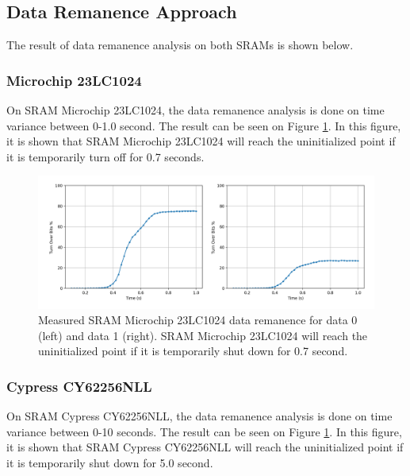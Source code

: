 \subsection{Data Remanence Approach}

The result of data remanence analysis on both SRAMs is shown below.

\subsubsection{Microchip 23LC1024}

On SRAM Microchip 23LC1024, the data remanence analysis is done on time variance between 0-1.0 second. The result can be seen on Figure \ref{fig:23lc1024-remanence0}. In this figure, it is shown that
SRAM Microchip 23LC1024 will reach the uninitialized point if it is temporarily turn off for 0.7 seconds.

\begin{figure}[tph!]
    \centerline{\includegraphics[width={\textwidth}]{images/remanence_23lc1024}}
    \caption{Measured SRAM Microchip 23LC1024 data remanence for data 0 (left) and data 1 (right).
    SRAM Microchip 23LC1024 will reach the uninitialized point if it is temporarily shut down for 0.7 second.}
    \label{fig:23lc1024-remanence0}
\end{figure}



\subsubsection{Cypress CY62256NLL}

On SRAM Cypress CY62256NLL, the data remanence analysis is done on time variance between 0-10 seconds. The result can be seen on Figure \ref{fig:23lc1024-remanence0}. In this figure, it is shown that
SRAM Cypress CY62256NLL will reach the uninitialized point if it is temporarily shut down for 5.0 second.

